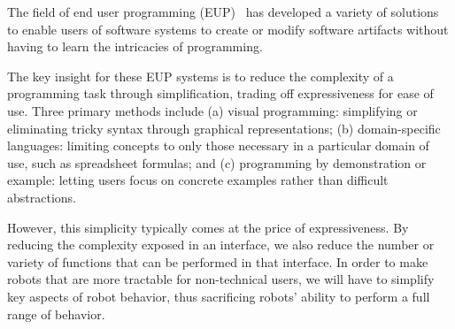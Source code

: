 \documentclass[10pt,twocolumn]{article}
\begin{document}
The field of end user programming (EUP)~\cite{lieberman-yourwish,dontcheva-nocode} has developed a variety of solutions to enable users of software systems to create or modify software artifacts without having to learn the intricacies of programming.  

The key insight for these EUP systems is to reduce the complexity of a programming task through simplification, trading off expressiveness for ease of use. Three primary methods include (a) visual programming: simplifying or eliminating tricky syntax through graphical representations; (b) domain-specific languages: limiting concepts to only those necessary in a particular domain of use, such as spreadsheet formulas; and (c) programming by demonstration or example: letting users focus on concrete examples rather than difficult abstractions.

However, this simplicity typically comes at the price of expressiveness. By reducing the complexity exposed in an interface, we also reduce the number or variety of functions that can be performed in that interface. In order to make robots that are more tractable for non-technical users, we will have to simplify key aspects of robot behavior, thus sacrificing robots' ability to perform a full range of behavior.



\end{document}
